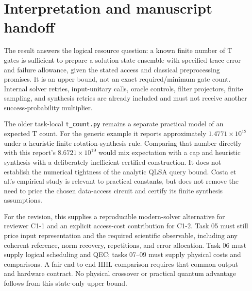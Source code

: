 \documentclass[11pt]{article}
\begin{document}
\section{Interpretation and manuscript handoff}
The result answers the logical resource question: a known finite number of T gates is sufficient to prepare a solution-state ensemble with specified trace error and failure allowance, given the stated access and classical preprocessing promises. It is an upper bound, not an exact required/minimum gate count. Internal solver retries, input-unitary calls, oracle controls, filter projectors, finite sampling, and synthesis retries are already included and must not receive another success-probability multiplier.

The older task-local \texttt{t\_count.py} remains a separate practical model of an expected T count. For the generic example it reports approximately $1.4771\times10^{12}$ under a heuristic finite rotation-synthesis rule. Comparing that number directly with this report's $8.6721\times10^{19}$ would mix expectation with a cap and heuristic synthesis with a deliberately inefficient certified construction. It does not establish the numerical tightness of the analytic QLSA query bound. Costa et al.'s empirical study is relevant to practical constants, but does not remove the need to price the chosen data-access circuit and certify its finite synthesis assumptions.

For the revision, this supplies a reproducible modern-solver alternative for reviewer C1-1 and an explicit access-cost contribution for C1-2. Task 05 must still price input representation and the required scientific observable, including any coherent reference, norm recovery, repetitions, and error allocation. Task 06 must supply logical scheduling and QEC; tasks 07--09 must supply physical costs and comparisons. A fair end-to-end HHL comparison requires that common output and hardware contract. No physical crossover or practical quantum advantage follows from this state-only upper bound.
\end{document}
